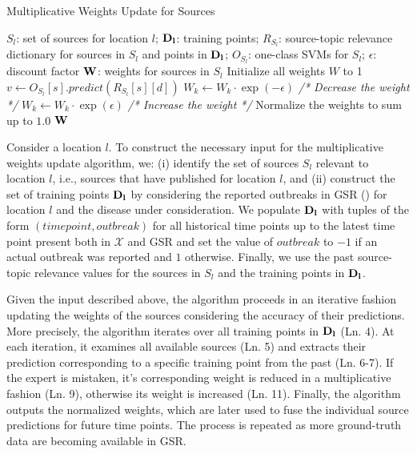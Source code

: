 \documentclass[twoside,leqno,twocolumn]{article}
\begin{document}
\vspace{-10pt}
\begin{algorithm}[h]
\centering
\captionsetup{font=scriptsize}
\caption{Multiplicative Weights Update for Sources}
{\footnotesize \begin{algorithmic}[1]
 $S_l$: set of sources for location $l$; ${\bf D_l}$: training points; $R_{S_l}$: source-topic relevance dictionary for sources in $S_l$ and points in ${\bf D_l}$; $O_{S_l}$: one-class SVMs for $S_l$; $\epsilon$: discount factor
 $\bf{W}$: weights for sources in $S_l$
\STATE Initialize all weights $W$ to 1
	\STATE $v \leftarrow O_{S_l}[s].predict(R_{S_l}[s][d])$
		\STATE  $W_k \leftarrow W_k\cdot \exp(-\epsilon)$ {\em /* Decrease the weight */}
	\ELSE
		\STATE $W_k \leftarrow W_k\cdot \exp(\epsilon)$ {\em /* Increase the weight */}
	\ENDIF
	\ENDFOR	
	\STATE Normalize the weights to sum up to $1.0$
\ENDFOR
\RETURN ${\bf W}$
\end{algorithmic}}
\label{algo:mw}
\end{algorithm}
\vspace{-10pt}

Consider a location $l$. To construct the necessary input for the multiplicative weights update algorithm, we: (i) identify the set of sources $S_l$ relevant to location $l$, i.e., sources that have published for location $l$, and (ii) construct the set of training points  ${\bf D_l}$ by considering the reported outbreaks in GSR () for location $l$ and the disease under consideration. We populate ${\bf D_l}$ with tuples of the form $(time point, outbreak)$ for all historical time points up to the latest time point present both in $\mathcal{X}$ and GSR and set the value of $outbreak$ to $-1$ if an actual outbreak was reported and $1$ otherwise. Finally, we use the past source-topic relevance values for the sources in $S_l$ and the training points in ${\bf D_l}$.

Given the input described above, the algorithm proceeds in an iterative fashion updating the weights of the sources considering the accuracy of their predictions. More precisely, the algorithm iterates over all training points in ${\bf D_l}$ (Ln. 4).  At each iteration, it examines all available sources (Ln. 5) and extracts their prediction corresponding to a specific training point from the past (Ln. 6-7). If the expert is mistaken, it's corresponding weight is reduced in a multiplicative fashion (Ln. 9), otherwise its weight is increased (Ln. 11). Finally, the algorithm outputs the normalized weights, which are later used to fuse the individual source predictions for future time points. The process is repeated as more ground-truth data are becoming available in GSR.
\end{document}
